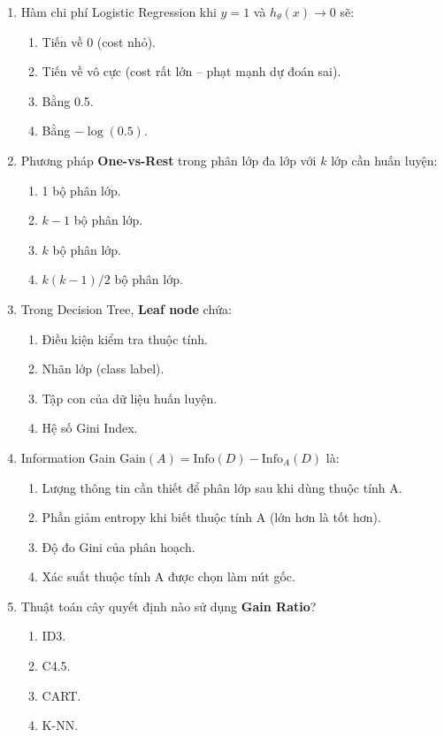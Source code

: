 \documentclass[10pt]{article}
\begin{document}
\begin{enumerate}[leftmargin=*, label=\textbf{Câu \arabic*.}]
    \item Hàm chi phí Logistic Regression khi $y=1$ và $h_\theta(x) \to 0$ sẽ:
    \begin{enumerate}[label=\Alph*.]
        \item Tiến về 0 (cost nhỏ).
        \item Tiến về vô cực (cost rất lớn -- phạt mạnh dự đoán sai).
        \item Bằng 0.5.
        \item Bằng $-\log(0.5)$.
    \end{enumerate}

    \item Phương pháp \textbf{One-vs-Rest} trong phân lớp đa lớp với $k$ lớp cần huấn luyện:
    \begin{enumerate}[label=\Alph*.]
        \item 1 bộ phân lớp.
        \item $k-1$ bộ phân lớp.
        \item $k$ bộ phân lớp.
        \item $k(k-1)/2$ bộ phân lớp.
    \end{enumerate}

    \item Trong Decision Tree, \textbf{Leaf node} chứa:
    \begin{enumerate}[label=\Alph*.]
        \item Điều kiện kiểm tra thuộc tính.
        \item Nhãn lớp (class label).
        \item Tập con của dữ liệu huấn luyện.
        \item Hệ số Gini Index.
    \end{enumerate}

    \item Information Gain $\text{Gain}(A) = \text{Info}(D) - \text{Info}_A(D)$ là:
    \begin{enumerate}[label=\Alph*.]
        \item Lượng thông tin cần thiết để phân lớp sau khi dùng thuộc tính A.
        \item Phần giảm entropy khi biết thuộc tính A (lớn hơn là tốt hơn).
        \item Độ đo Gini của phân hoạch.
        \item Xác suất thuộc tính A được chọn làm nút gốc.
    \end{enumerate}

    \item Thuật toán cây quyết định nào sử dụng \textbf{Gain Ratio}?
    \begin{enumerate}[label=\Alph*.]
        \item ID3.
        \item C4.5.
        \item CART.
        \item K-NN.
    \end{enumerate}


\end{enumerate}
\end{document}

